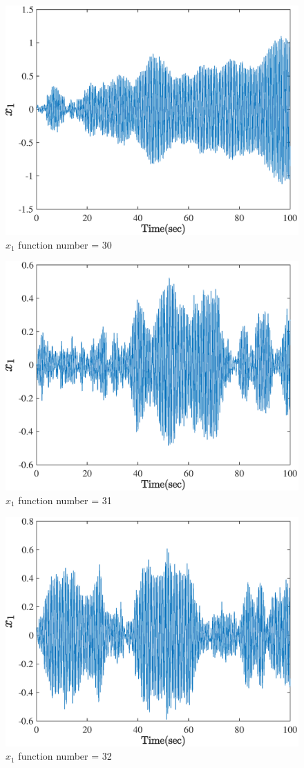   \begin{figure}[H] 
  	\caption{$x_1$ function number = 30} 
  	\centering 
  	\includegraphics[width=12cm]{../Figure/Q5/part_a/30} 
  \end{figure}
  \begin{figure}[H] 
  	\caption{$x_1$ function number = 31} 
  	\centering 
  	\includegraphics[width=12cm]{../Figure/Q5/part_a/31} 
  \end{figure}
  \begin{figure}[H] 
  	\caption{$x_1$ function number = 32} 
  	\centering 
  	\includegraphics[width=12cm]{../Figure/Q5/part_a/32} 
  \end{figure}
